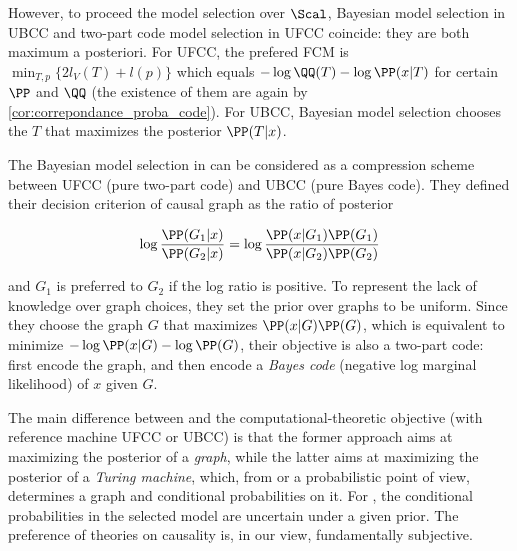 However, to proceed the model selection over $\Scal$, Bayesian model selection in UBCC and two-part code model selection in UFCC coincide: they are both maximum a posteriori. For UFCC, the prefered FCM is $\min_{T,p}\{2l_V(T) + l(p)\}$ which equals $-\log\QQ(T) -\log\PP(x|T)$ for certain $\PP$ and $\QQ$ (the existence of them are again by \cref{cor:correpondance_proba_code}). For UBCC, Bayesian model selection chooses the $T$ that maximizes the posterior $\PP(T|x)$.

The Bayesian model selection in \cite{dhirbivariate} can be considered as a compression scheme between UFCC (pure two-part code) and UBCC (pure Bayes code). They defined their decision criterion of causal graph as the ratio of posterior

\begin{equation}
    \log\frac{\PP(G_1|x)}{\PP(G_2|x)}=\log\frac{\PP(x|G_1)\PP(G_1)}{\PP(x|G_2)\PP(G_2)}
\end{equation}

and $G_1$ is preferred to $G_2$ if the log ratio is positive. To represent the lack of knowledge over graph choices, they set the prior over graphs to be uniform. Since they choose the graph $G$ that maximizes $\PP(x|G)\PP(G)$, which is equivalent to minimize $-\log \PP(x|G) - \log \PP(G)$, their objective is also a two-part code: first encode the graph, and then encode a \textit{Bayes code} (negative log marginal likelihood) of $x$ given $G$.

The main difference between \cite{dhirbivariate} and the computational-theoretic objective (with reference machine UFCC or UBCC) is that the former approach \citep{dhirbivariate} aims at maximizing the posterior of a \textit{graph}, while the latter aims at maximizing the posterior of a \textit{Turing machine}, which, from \cite{dhirbivariate} or a probabilistic point of view, determines a graph and conditional probabilities on it. For \cite{dhirbivariate}, the conditional probabilities in the selected model are uncertain under a given prior. The preference of theories on causality is, in our view, fundamentally subjective.

%

